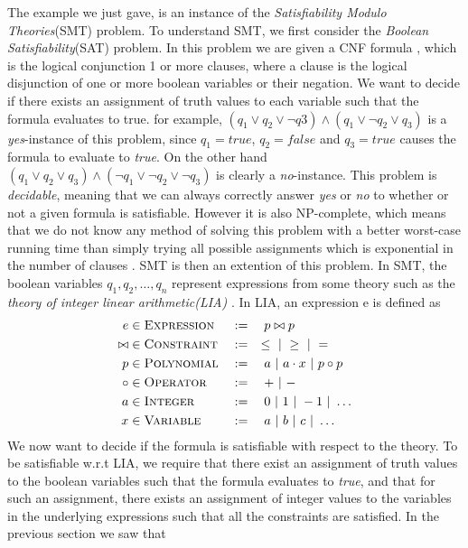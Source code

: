 	The example we just gave, is an instance of the \emph{Satisfiability Modulo Theories}(SMT) problem. To understand SMT, we first consider the \emph{Boolean Satisfiability}(SAT) problem. In this problem we are given a CNF formula , which is the logical conjunction 1 or more clauses, where a clause is the logical disjunction of one or more boolean variables or their negation.  We want to decide if there exists an assignment of truth values to each variable such that the formula evaluates to true. for example, $(q_1 \lor q_2 \lor \neg q3) \land (q_1 \lor \neg q_2 \lor q_3)$ is a \emph{yes}-instance of this problem, since $q_1 = true$, $q_2 = false$ and $q_3 = true$ causes the formula to evaluate to \emph{true}. On the other hand $(q_1 \lor q_2 \lor q_3) \land (\neg q_1 \lor \neg q_2 \lor \neg q_3)$ is clearly a \emph{no}-instance. This problem is \emph{decidable}, meaning that we can always correctly answer \emph{yes} or \emph{no} to whether or not a given formula is satisfiable. However it is also NP-complete, which means that we do not know any method of solving this problem with a better worst-case running time than simply trying all possible assignments which is exponential in the number of clauses \citep{Miltersen15}. SMT is then an extention of this problem. In SMT, the boolean variables $q_1, q_2, \ldots, q_n$ represent expressions from some theory such as the \emph{theory of integer linear arithmetic(LIA)} \citep{DeMoura2011}. In LIA, an expression e is defined as 
		\begin{alignat*}{3}
			e & \in \textsc{Expression} && := \quad p \bowtie p\\
			\bowtie & \in \textsc{Constraint} && := \quad \leq \ | \  \geq \ | \  =\\
			p & \in \textsc{Polynomial} && := \quad a \ | \  a\cdot x \ | \  p \circ p\\
			\circ & \in \textsc{Operator} && := \quad + \ | \  - \\
			a & \in \textsc{Integer} && := \quad 0 \ | \  1 \ | \  -1 \ | \  \ldots\\ 
			x & \in \textsc{Variable} && := \quad a \ | \  b \ | \  c \ | \  \ldots		
		\end{alignat*} 
	We now want to decide if the formula is satisfiable with respect to the theory. To be satisfiable w.r.t LIA, we require that there exist an assignment of truth values to the boolean variables such that the formula evaluates to \emph{true}, and that for such an assignment, there exists an assignment of integer values to the variables in the underlying expressions such that all the constraints are satisfied. In the previous section we saw that 
	
